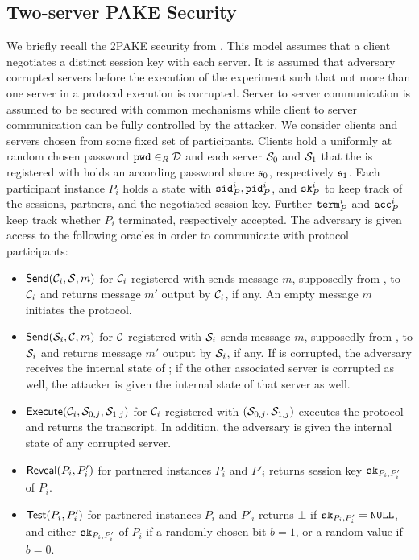 \subsection{Two-server PAKE Security}
We briefly recall the \ac{2PAKE} security from \citet{Katz2012a}.
This model assumes that a client negotiates a distinct session key with each server.
It is assumed that adversary \cA corrupted servers before the execution of the experiment such that not more than one server in a protocol execution is corrupted.
Server to server communication is assumed to be secured with common mechanisms while client to server communication can be fully controlled by the attacker.
We consider clients \Client and servers \Server chosen from some fixed set of participants.
Clients hold a uniformly at random chosen password $\mathtt{pwd}\in_R\mathcal{D}$ and each server $\mathcal{S}_0$ and $\mathcal{S}_1$ that the is registered with holds an according password share $\mathfrak{s}_0$, respectively $\mathfrak{s}_1$.
Each participant instance $P_i$ holds a state with $\mathtt{sid}_P^i, \mathtt{pid}_P^i$, and $\mathtt{sk}_P^i$ to keep track of the sessions, partners, and the negotiated session key.
Further $\mathtt{term}_P^i$ and $\mathtt{acc}_P^i$ keep track whether $P_i$ terminated, respectively accepted.
The adversary is given access to the following oracles in order to communicate with protocol participants:

\begin{itemize}
  \item $\mathsf{Send}(\mathcal{C}_i, \mathcal{S}, m)$ for $\mathcal{C}_i$ registered with \Server sends message $m$, supposedly from \Server, to $\mathcal{C}_i$ and returns message $m'$ output by $\mathcal{C}_i$, if any.
    An empty message $m$ initiates the protocol.
  
  \item $\mathsf{Send}(\mathcal{S}_i, \mathcal{C}, m)$ for $\mathcal{C}$ registered with $\mathcal{S}_i$ sends message $m$, supposedly from \Client, to $\mathcal{S}_i$ and returns message $m'$ output by $\mathcal{S}_i$, if any.
    If \Server is corrupted, the adversary receives the internal state of \Server; if the other associated server is corrupted as well, the attacker is given the internal state of that server as well.
    
  \item $\mathsf{Execute}(\mathcal{C}_i, \mathcal{S}_{0,j}, \mathcal{S}_{1,j})$ for $\mathcal{C}_i$ registered with $(\mathcal{S}_{0,j},\mathcal{S}_{1,j})$ executes the protocol and returns the transcript.
    In addition, the adversary is given the internal state of any corrupted server.
  
  \item $\mathsf{Reveal}(P_i, P'_i)$ for partnered instances $P_i$ and $P'_i$ returns session key $\mathtt{sk}_{P_i,P'_i}$ of $P_i$.
  
  \item $\mathsf{Test}(P_i, P'_i)$ for partnered instances $P_i$ and $P'_i$ returns $\bot$ if $\mathtt{sk}_{P_i, P'_i}=\mathtt{NULL}$, and either $\mathtt{sk}_{P_i,P'_i}$ of $P_i$ if a randomly chosen bit $b=1$, or a random value if $b=0$.
    
\end{itemize}

